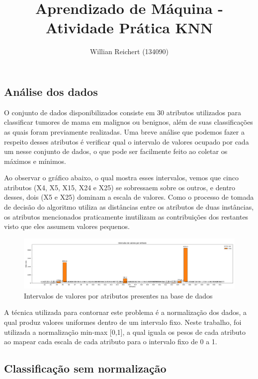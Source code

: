 \documentclass{article}
\title{Aprendizado de Máquina - Atividade Prática KNN}
\author{Willian Reichert (134090)}
\date{}
\begin{document}
\maketitle

\subsection*{Análise dos dados}

O conjunto de dados disponibilizados consiste em 30 atributos utilizados para classificar tumores de mama em malignos ou benignos, além de suas classificações as quais foram previamente realizadas. Uma breve análise que podemos fazer a respeito desses atributos é verificar qual o intervalo de valores ocupado por cada um nesse conjunto de dados, o que pode ser facilmente feito ao coletar os máximos e mínimos.

Ao observar o gráfico abaixo, o qual mostra esses intervalos, vemos que cinco atributos (X4, X5, X15, X24 e X25) se sobressaem sobre os outros, e dentro desses, dois (X5 e X25) dominam a escala de valores. Como o processo de tomada de decisão do algoritmo utiliza as distâncias entre os atributos de duas instâncias, os atributos mencionados praticamente inutilizam as contribuições dos restantes visto que eles assumem valores pequenos.

\begin{figure}[h]
    \includegraphics[width=\textwidth]{attribs_plot.png}
    \caption{Intervalos de valores por atributos presentes na base de dados}
    \centering
\end{figure}

A técnica utilizada para contornar este problema é a normalização dos dados, a qual produz valores uniformes dentro de um intervalo fixo. Neste trabalho, foi utilizada a normalização min-max [0,1], a qual iguala os pesos de cada atributo ao mapear cada escala de cada atributo para o intervalo fixo de 0 a 1.

\subsection*{Classificação sem normalização}
\end{document}
